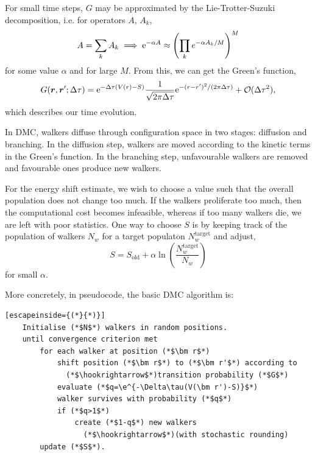For small time steps, $G$ may be approximated by the Lie-Trotter-Suzuki decomposition,\supercite{lieTheorie1970,trotterProduct1959,suzukiGeneralized1976} i.e. for operators $A$, $A_k$,
\begin{equation}
    A = \sum_kA_k \implies \mathrm{e}^{-\alpha A} \approx \left( \prod_k e^{-\alpha A_k/M} \right)^M
\end{equation}
for some value $\alpha$ and for large $M$. From this, we can get the Green's function,
\begin{equation}
    G(\bm r, \bm r'; \Delta\tau) = \mathrm{e}^{-\Delta\tau(V(r)-S)}\frac{1}{\sqrt{2\pi\Delta\tau}}\mathrm{e}^{-(r - r')^2/(2\pi\Delta\tau)}+\mathcal{O}(\Delta\tau^2),
\end{equation}
which describes our time evolution.

In \gls{DMC}, walkers diffuse through configuration space in two stages: diffusion and branching. In the diffusion step, walkers are moved according to the kinetic terms in the Green's function. In the branching step, unfavourable walkers are removed and favourable ones produce new walkers.

For the energy shift estimate, we wish to choose a value such that the overall population does not change too much. If the walkers proliferate too much, then the computational cost becomes infeasible, whereas if too many walkers die, we are left with poor statistics. One way to choose $S$ is by keeping track of the population of walkers $N_w$ for a target populaton $N_w^\mathrm{target}$ and adjust,
\begin{equation}
    S = S_\mathrm{old} + \alpha\ln\left(\frac{N_w^\mathrm{target}}{N_w}\right)
\end{equation}
for small $\alpha$.

More concretely, in pseudocode, the basic \gls{DMC} algorithm is:

\begin{minipage}{\textwidth}
\begin{lstlisting}[escapeinside={(*}{*)}]
    Initialise (*$N$*) walkers in random positions.
    until convergence criterion met
        for each walker at position (*$\bm r$*)
            shift position (*$\bm r$*) to (*$\bm r'$*) according to
              (*$\hookrightarrow$*)transition probability (*$G$*)
            evaluate (*$q=\e^{-\Delta\tau(V(\bm r')-S)}$*)
            walker survives with probability (*$q$*)
            if (*$q>1$*)
                create (*$1-q$*) new walkers
                  (*$\hookrightarrow$*)(with stochastic rounding)
        update (*$S$*).
\end{lstlisting}
\end{minipage}

